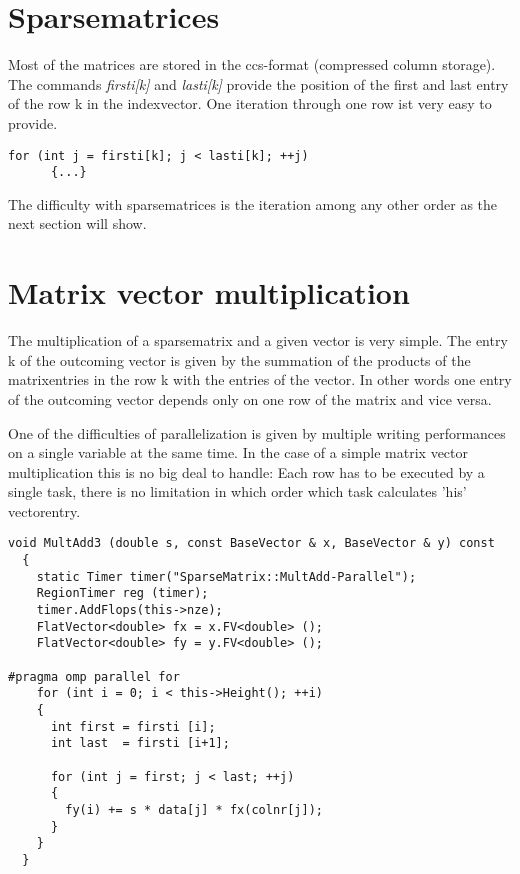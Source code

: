 \documentclass[a4paper,11pt]{scrartcl}
\begin{document}
\section{Sparsematrices}

Most of the matrices are stored in the ccs-format (compressed column storage).
 The commands {\em firsti[k]} and {\em lasti[k]} provide the position of the
 first and last entry of the row k in the indexvector. One
 iteration through one row ist very easy to provide.

\begin{lstlisting}
for (int j = firsti[k]; j < lasti[k]; ++j)
      {...}

\end{lstlisting}

The difficulty with sparsematrices is the iteration among any other order as
the next section will show.

\section{Matrix vector multiplication}

The multiplication of a sparsematrix and a given vector is very simple.
The entry k of the outcoming vector is given by the summation of the products
of the matrixentries in the row k with the entries of the vector. In other
words one entry of the outcoming vector depends only on one row of the matrix
and vice versa.

One of the difficulties of parallelization is given by multiple writing
performances on a single variable at the same time. In the case of a simple
 matrix vector multiplication this is no big deal to handle: Each row has to be
executed by a single task, there is no limitation in which order which task
 calculates 'his' vectorentry.

\begin{lstlisting}
void MultAdd3 (double s, const BaseVector & x, BaseVector & y) const
  {
    static Timer timer("SparseMatrix::MultAdd-Parallel");
    RegionTimer reg (timer);
    timer.AddFlops(this->nze);
    FlatVector<double> fx = x.FV<double> ();
    FlatVector<double> fy = y.FV<double> ();

#pragma omp parallel for
    for (int i = 0; i < this->Height(); ++i)
    {
      int first = firsti [i];
      int last  = firsti [i+1];

      for (int j = first; j < last; ++j)
      {
        fy(i) += s * data[j] * fx(colnr[j]);
      }
    }
  }

\end{lstlisting}
\end{document}

